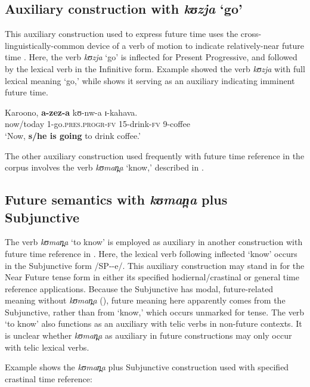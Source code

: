 \documentclass[output=paper]{langsci/langscibook}
\begin{document}
\subsection{Auxiliary construction with \textit{kʊzja} ‘go’} \label{sec:sarvasy:7.2}

This auxiliary construction used to express future time uses the cross-linguistically-com\-mon device of a verb of motion to indicate relatively-near future time \citep[161-163]{HeineKuteva2004}. Here, the verb \textit{kʊzja} ‘go’ is inflected for Present Progressive, and followed by the lexical verb in the Infinitive form. Example  showed the verb \textit{kʊzja} with full lexical meaning ‘go,’ while  shows it serving as an auxiliary indicating imminent future time. 

\ea\label{ex:sarvasy:19}
\gll Karoono,   \textbf{a-zez-a}      kʊ-nw-a  ɪ-kahava. \\
now/today  1-go.\textsc{pres.progr-fv}  15-drink-\textsc{fv}  9-coffee \\
\glt ‘Now, \textbf{s/he is going} to drink coffee.’
\z

The other auxiliary construction used frequently with future time reference in the corpus involves the verb \textit{kʊman̪a} ‘know,’ described in .

\subsection{Future semantics with \textit{k}\textit{ʊman̪a}\textit{} plus Subjunctive} \label{sec:sarvasy:7.3}

The verb \textit{kʊman̪a} ‘to know’ is employed as auxiliary in another construction with future time reference in . Here, the lexical verb following inflected ‘know’ occurs in the Subjunctive form /SP-{\longrule}-e/. This auxiliary construction may stand in for the Near Future tense form in either its specified hodiernal/crastinal or general time reference applications. Because the Subjunctive has modal, future-related meaning without \textit{kʊman̪a} (), future meaning here apparently comes from the Subjunctive, rather than from ‘know,’ which occurs unmarked for tense. The verb ‘to know’ also functions as an auxiliary with telic verbs in non-future contexts. It is unclear whether \textit{kʊman̪a} as auxiliary in future constructions may only occur with telic lexical verbs.

Example  shows the \textit{kʊman̪a} plus Subjunctive construction used with specified crastinal time reference:
\end{document}
